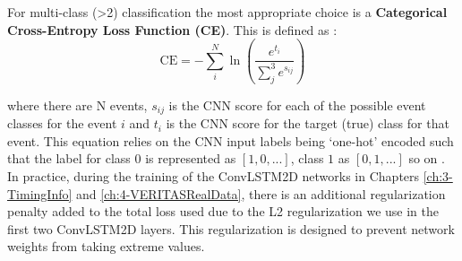For multi-class (>2) classification the most appropriate choice is a \textbf{Categorical Cross-Entropy Loss Function (CE)}. This is defined \cite{Keras} as :
\begin{equation}
    \textrm{CE}=-\sum_i^N \ln \left( \frac{e^{t_{i}}}{\sum_j^3 e^{s_{ij}}} \right)
\end{equation}

where there are N events, $s_{ij}$  is the CNN score for each of the possible event classes for the event $i$ and $t_{i}$ is the CNN score for the target (true) class for that event. This equation relies on the CNN input labels being `one-hot' encoded such that the label for class $0$ is represented as $[1,0,...]$, class $1$ as $[0,1,...]$ so on \cite{fb}. In practice, during the training of the ConvLSTM2D networks in Chapters \ref{ch:3-TimingInfo} and \ref{ch:4-VERITASRealData}, there is an additional regularization penalty added to the total loss used due to the L2 regularization we use in the first two ConvLSTM2D layers. This regularization is designed to prevent network weights from taking extreme values.

\begin{table}[ht]
    \centering
    \caption{Definitions of Event Classifications for binary classification, taken from \cite{fawcett}.}
    \label{table:FPR}
\end{table}

